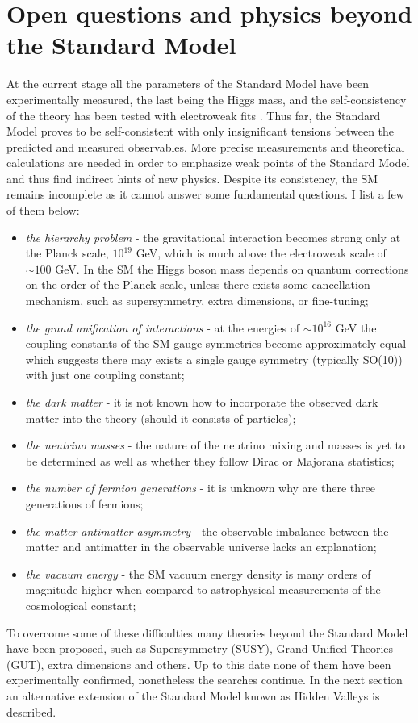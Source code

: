 \section{Open questions and physics beyond the Standard Model}

At the current stage all the parameters of the Standard Model have been experimentally measured,
the last being the Higgs mass, and the
self-consistency of the theory has been tested with electroweak fits \cite{Baak:2013ppa}.
Thus far, the Standard Model proves to be self-consistent with only insignificant tensions between
the predicted and measured observables. More precise measurements and theoretical calculations
are needed in order to emphasize weak points of the Standard Model and thus
find indirect hints of new physics.
Despite its consistency, the SM remains incomplete as it cannot answer some fundamental 
questions. I list a few of them below:
\begin{itemize}
 \item {\it the hierarchy problem} - the gravitational interaction becomes strong only at the 
Planck scale, $10^{19}$ GeV, which is much above the electroweak scale of $\sim 100$ GeV. 
In the SM the Higgs boson mass 
depends on quantum corrections on the order of the Planck scale, unless there
exists some cancellation mechanism, such as supersymmetry, extra dimensions, or fine-tuning; 
 \item {\it the grand unification of interactions} - at the energies of $\sim 10^{16}$ GeV
the coupling constants of the SM gauge symmetries become approximately equal which suggests
there may exists a single gauge symmetry (typically SO(10)) with just one coupling constant;
 \item {\it the dark matter} - it is not known how to incorporate the observed
 dark matter into the theory (should it consists of particles);
 \item {\it the neutrino masses} - the nature of the neutrino mixing and masses is yet to be
determined as well as whether they follow Dirac or Majorana statistics;
 \item {\it the number of fermion generations} - it is unknown why are there three generations
of fermions;
 \item {\it the matter-antimatter asymmetry} - the observable imbalance between the matter and
antimatter in the observable universe lacks an explanation;
 \item {\it the vacuum energy} - the SM vacuum
energy density is many orders of magnitude higher when compared to astrophysical measurements
of the cosmological constant;
\end{itemize}
To overcome some of these difficulties many theories beyond the Standard Model have been
proposed, such as Supersymmetry (SUSY), Grand Unified Theories (GUT), extra dimensions and others.
Up to this date none of them have been experimentally confirmed, nonetheless the searches continue.
In the next section an alternative extension of the Standard Model known as Hidden Valleys 
is described. 

